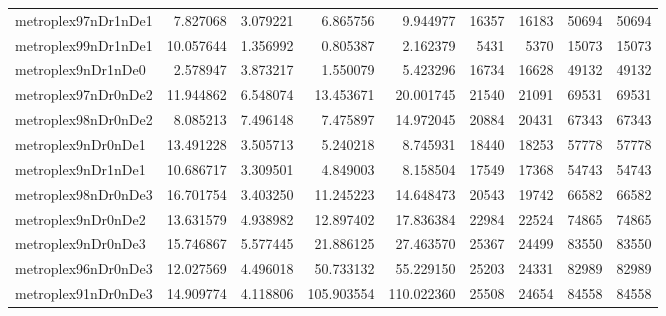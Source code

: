 \begin{longtable}{|l|r|r|r|r|r|r|r|r|}
metroplex97nDr1nDe1 & 7.827068 & 3.079221 & 6.865756 & 9.944977 & 16357 & 16183 & 50694 & 50694 \\
metroplex99nDr1nDe1 & 10.057644 & 1.356992 & 0.805387 & 2.162379 & 5431 & 5370 & 15073 & 15073 \\
metroplex9nDr1nDe0 & 2.578947 & 3.873217 & 1.550079 & 5.423296 & 16734 & 16628 & 49132 & 49132 \\
metroplex97nDr0nDe2 & 11.944862 & 6.548074 & 13.453671 & 20.001745 & 21540 & 21091 & 69531 & 69531 \\
metroplex98nDr0nDe2 & 8.085213 & 7.496148 & 7.475897 & 14.972045 & 20884 & 20431 & 67343 & 67343 \\
metroplex9nDr0nDe1 & 13.491228 & 3.505713 & 5.240218 & 8.745931 & 18440 & 18253 & 57778 & 57778 \\
metroplex9nDr1nDe1 & 10.686717 & 3.309501 & 4.849003 & 8.158504 & 17549 & 17368 & 54743 & 54743 \\
metroplex98nDr0nDe3 & 16.701754 & 3.403250 & 11.245223 & 14.648473 & 20543 & 19742 & 66582 & 66582 \\
metroplex9nDr0nDe2 & 13.631579 & 4.938982 & 12.897402 & 17.836384 & 22984 & 22524 & 74865 & 74865 \\
metroplex9nDr0nDe3 & 15.746867 & 5.577445 & 21.886125 & 27.463570 & 25367 & 24499 & 83550 & 83550 \\
metroplex96nDr0nDe3 & 12.027569 & 4.496018 & 50.733132 & 55.229150 & 25203 & 24331 & 82989 & 82989 \\
metroplex91nDr0nDe3 & 14.909774 & 4.118806 & 105.903554 & 110.022360 & 25508 & 24654 & 84558 & 84558 \\
\end{longtable}
